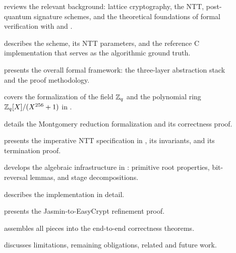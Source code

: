 \begin{description}
  \item[] reviews the relevant background: lattice
        cryptography, the NTT, post-quantum signature schemes, and the
        theoretical foundations of formal verification with \easycrypt{} and
        \jasmin{}.

  \item[] describes the \haetae{} scheme, its NTT
        parameters, and the reference C implementation that serves as the
        algorithmic ground truth.

  \item[] presents the overall formal framework:
        the three-layer abstraction stack and the proof methodology.

  \item[] covers the formalization of the field
        $\mathbb{Z}_q$ and the polynomial ring $\mathbb{Z}_q[X]/(X^{256}+1)$ in \easycrypt{}.

  \item[] details the Montgomery reduction
        formalization and its correctness proof.

  \item[] presents the imperative NTT specification in
        , its invariants, and its termination proof.

  \item[] develops the algebraic infrastructure
        in : primitive root properties, bit-reversal
        lemmas, and stage decompositions.

  \item[] describes the \jasmin{} implementation in
        detail.

  \item[] presents the Jasmin-to-EasyCrypt refinement
        proof.

  \item[] assembles all pieces into the end-to-end
        correctness theorems.

  \item[] discusses limitations, remaining obligations,
        related and future work.
\end{description}
